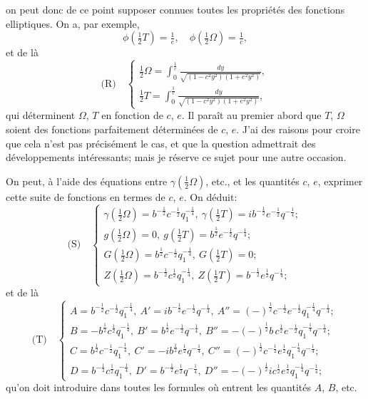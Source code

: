 \documentclass[12pt,a4paper]{article}
\begin{document}
on peut donc de ce point supposer connues toutes les propri\'et\'es des fonctions elliptiques. On a, par exemple,
\[
\phi(\tfrac12 T) = \tfrac{1}{e},\quad \phi(\tfrac12\Omega) = \tfrac{1}{c},
\]
et de l\`a
\[
\text{(R)}\quad
\begin{cases}
\tfrac12 \Omega = \displaystyle\int_0^{\frac1c}\frac{dy}{\sqrt{(1 - c^2 y^2)(1 + e^2 y^2)}},\\[8pt]
\tfrac12 T = \displaystyle\int_0^{\frac1e}\frac{dy}{\sqrt{(1 - c^2 y^2)(1 + e^2 y^2)}},
\end{cases}
\]
qui d\'eterminent $\Omega$, $T$ en fonction de $c$, $e$. Il para\^it au premier abord que $T$, $\Omega$ soient des fonctions parfaitement d\'etermin\'ees de $c$, $e$. J'ai des raisons pour croire que cela n'est pas pr\'ecis\'ement le cas, et que la question admettrait des d\'eveloppements int\'eressants; mais je r\'eserve ce sujet pour une autre occasion.

On peut, \`a l'aide des \'equations entre $\gamma(\tfrac12\Omega)$, etc., et les quantit\'es $c$, $e$, exprimer cette suite de fonctions en termes de $c$, $e$. On d\'eduit:
\[
\text{(S)}\quad
\begin{cases}
\gamma(\tfrac12\Omega) = b^{-\frac12}c^{-\frac12}q_1^{-\frac14},\ \gamma(\tfrac12 T) = ib^{-\frac12}e^{-\frac12}q^{-\frac14};\\
g(\tfrac12\Omega) = 0,\ g(\tfrac12 T) = b^{\frac12}e^{-\frac12}q^{-\frac14};\\
G(\tfrac12\Omega) = b^{\frac12}c^{-\frac12}q_1^{-\frac14},\ G(\tfrac12 T) = 0;\\
Z(\tfrac12\Omega) = b^{-\frac12}c^{\frac12}q_1^{-\frac14},\ Z(\tfrac12 T) = b^{-\frac12}e^{\frac12}q^{-\frac14};
\end{cases}
\]
et de l\`a
\[
\text{(T)}\quad
\begin{cases}
A = b^{-\frac12}c^{-\frac12}q_1^{-\frac14},\ A' = ib^{-\frac12}e^{-\frac12}q^{-\frac14},\ A'' = (-)^{\frac12}c^{-\frac12}e^{-\frac12}q_1^{-\frac14}q^{-\frac14};\\
B = -b^{\frac12}c^{\frac12}q_1^{-\frac14},\ B' = b^{\frac12}e^{-\frac12}q^{-\frac14},\ B'' = -(-)^{\frac12}b\,c^{\frac12}e^{-\frac12}q_1^{-\frac14}q^{-\frac14};\\
C = b^{\frac12}c^{-\frac12}q_1^{-\frac14},\ C' = -ib^{\frac12}e^{\frac12}q^{-\frac14},\ C'' = (-)^{\frac12}c^{-\frac12}e^{\frac12}q_1^{-\frac14}q^{-\frac14};\\
D = b^{-\frac12}c^{\frac12}q_1^{-\frac14},\ D' = b^{-\frac12}e^{\frac12}q^{-\frac14},\ D'' = -(-)^{\frac12}i c^{\frac12}e^{\frac12}q_1^{-\frac14}q^{-\frac14};
\end{cases}
\]
qu'on doit introduire dans toutes les formules o\`u entrent les quantit\'es $A$, $B$, etc.
\end{document}
